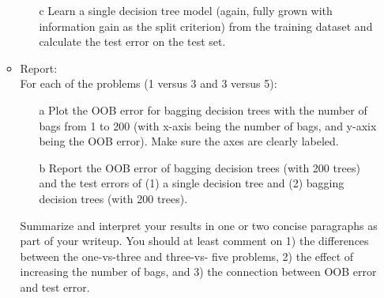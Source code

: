 \documentclass[11pt]{article}
\begin{document}
\begin{enumerate}
\begin{itemize}
\begin{itemize}
        \item[c] Learn a single decision tree model (again, fully grown with information gain as the split criterion) from the training dataset and calculate the test error on the test set.
    \end{itemize}
    
    \item Report:\\
        For each of the problems (1 versus 3 and 3 versus 5):
        \begin{itemize}
            \item[a] Plot the OOB error for bagging decision trees with the number of bags from 1 to 200 (with x-axis being the number of bags, and y-axix being the OOB error). Make sure the axes are clearly labeled.
            \item[b] Report the OOB error of bagging decision trees (with 200 trees) and the test errors of (1) a single decision tree and (2) bagging decision trees (with 200 trees).
        \end{itemize}
        
        Summarize and interpret your results in one or two concise paragraphs as part of your writeup.
        You should at least comment on 1) the differences between the one-vs-three and three-vs- five problems, 2) the effect of increasing the number of bags, and 3) the connection between OOB error and test error.
\end{itemize}



\end{enumerate}
\end{document}
